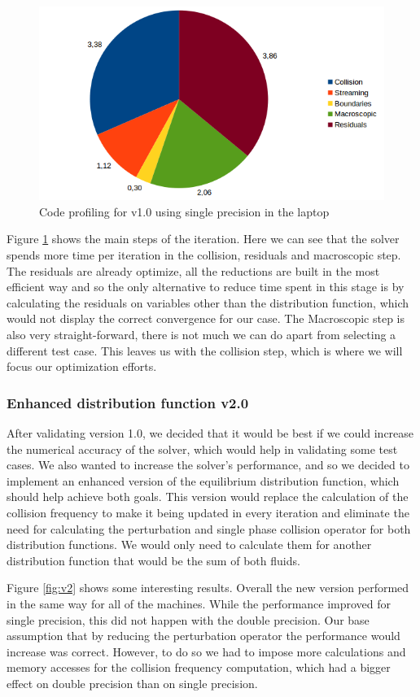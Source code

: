 \documentclass[12pt, openany]{book}
\begin{document}
    \begin{figure}[H]
    	\centering
    	\includegraphics[width=\linewidth]{Resources/Images/v1profile.png}
    	\caption{Code profiling for v1.0 using single precision in the laptop}
    	\label{fig:v1profile}
    \end{figure}
    
    Figure \ref{fig:v1profile} shows the main steps of the iteration. Here we can see that the solver spends more time per iteration in the collision, residuals and macroscopic step. The residuals are already optimize, all the reductions are built in the most efficient way and so the only alternative to reduce time spent in this stage is by calculating the residuals on variables other than the distribution function, which would not display the correct convergence for our case. The Macroscopic step is also very straight-forward, there is not much we can do apart from selecting a different test case. This leaves us with the collision step, which is where we will focus our optimization efforts.
  
\subsubsection{Enhanced distribution function v2.0}
After validating version 1.0, we decided that it would be best if we could increase the numerical accuracy of the solver, which would help in validating some test cases. We also wanted to increase the solver's performance, and so we decided to implement an enhanced version of the equilibrium distribution function, which should help achieve both goals. This version would replace the calculation of the collision frequency to make it being updated in every iteration and eliminate the need for calculating the perturbation and single phase collision operator for both distribution functions. We would only need to calculate them for another distribution function that would be the sum of both fluids.\par
  Figure \ref{fig:v2} shows some interesting results. Overall the new version performed in the same way for all of the machines. While the performance improved for single precision, this did not happen with the double precision. Our base assumption that by reducing the perturbation operator the performance would increase was correct. However, to do so we had to impose more calculations and memory accesses for the collision frequency computation, which had a bigger effect on double precision than on single precision. 
\end{document}
